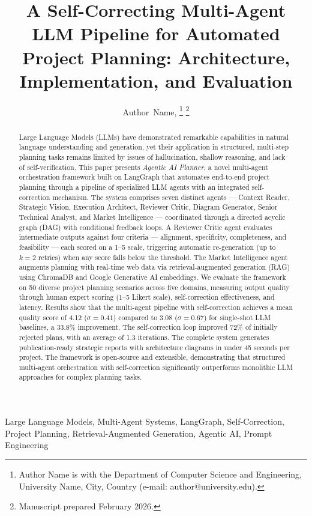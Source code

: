 \documentclass[journal]{IEEEtran}
\title{A Self-Correcting Multi-Agent LLM Pipeline for Automated Project Planning: Architecture, Implementation, and Evaluation}
\author{Author~Name,
        \IEEEmembership{Student Member, IEEE}%
\thanks{Author Name is with the Department of Computer Science and Engineering, University Name, City, Country (e-mail: author@university.edu).}%
\thanks{Manuscript prepared February 2026.}}
\begin{document}
\maketitle

\begin{abstract}
Large Language Models (LLMs) have demonstrated remarkable capabilities in natural language understanding and generation, yet their application in structured, multi-step planning tasks remains limited by issues of hallucination, shallow reasoning, and lack of self-verification. This paper presents \textit{Agentic AI Planner}, a novel multi-agent orchestration framework built on LangGraph that automates end-to-end project planning through a pipeline of specialized LLM agents with an integrated self-correction mechanism. The system comprises seven distinct agents --- Context Reader, Strategic Vision, Execution Architect, Reviewer Critic, Diagram Generator, Senior Technical Analyst, and Market Intelligence --- coordinated through a directed acyclic graph (DAG) with conditional feedback loops. A Reviewer Critic agent evaluates intermediate outputs against four criteria --- alignment, specificity, completeness, and feasibility --- each scored on a 1--5 scale, triggering automatic re-generation (up to $k=2$ retries) when any score falls below the threshold. The Market Intelligence agent augments planning with real-time web data via retrieval-augmented generation (RAG) using ChromaDB and Google Generative AI embeddings. We evaluate the framework on 50 diverse project planning scenarios across five domains, measuring output quality through human expert scoring (1--5 Likert scale), self-correction effectiveness, and latency. Results show that the multi-agent pipeline with self-correction achieves a mean quality score of 4.12 ($\sigma=0.41$) compared to 3.08 ($\sigma=0.67$) for single-shot LLM baselines, a 33.8\% improvement. The self-correction loop improved 72\% of initially rejected plans, with an average of 1.3 iterations. The complete system generates publication-ready strategic reports with architecture diagrams in under 45 seconds per project. The framework is open-source and extensible, demonstrating that structured multi-agent orchestration with self-correction significantly outperforms monolithic LLM approaches for complex planning tasks.
\end{abstract}

\begin{IEEEkeywords}
Large Language Models, Multi-Agent Systems, LangGraph, Self-Correction, Project Planning, Retrieval-Augmented Generation, Agentic AI, Prompt Engineering
\end{IEEEkeywords}
\end{document}
